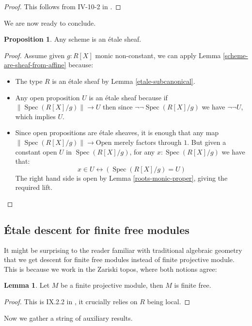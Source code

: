 \documentclass[10pt,a4paper]{article}
\theoremstyle{definition}
\newtheorem{lemma}[theorem]{Lemma}
\newtheorem{proposition}[theorem]{Proposition}
\DeclareMathOperator{\Spec}{Spec}
\newcommand{\propTrunc}[1]{\lVert #1 \rVert}
\begin{document}
\begin{proof}
  This follows from  IV-10-2 in \cite{lombardi-quitte}.
\end{proof}

We are now ready to conclude.

\begin{proposition}\label{scheme-is-etale-sheaf}
Any scheme is an \'etale sheaf.
\end{proposition}

\begin{proof}
Assume given $g:R[X]$ monic non-constant, we can apply Lemma \ref{scheme-are-sheaf-from-affine} because:
\begin{itemize}
\item The type $R$ is an \'etale sheaf by Lemma \ref{etale-subcanonical}.
\item Any open proposition $U$ is an \'etale sheaf because if $\propTrunc{\Spec(R[X]/g)}\to U$ then since $\neg\neg\Spec(R[X]/g)$ we have $\neg\neg U$, which implies $U$.
\item Since open propositions are \'etale sheaves, it is enough that any map $\propTrunc{\Spec(R[X]/g)}\to \mathrm{Open}$ merely factors through $1$. But given a constant open $U$ in $\Spec(R[X]/g)$, for any $x:\Spec(R[X]/g)$ we have that:
\[x\in U \leftrightarrow (\Spec(R[X]/g) = U)\]
The right hand side is open by Lemma \ref{roots-monic-proper}, giving the required lift. 
\end{itemize}
\end{proof}


\subsection{Étale descent for finite free modules}

It might be surprising to the reader familiar with traditional algebraic geometry that we get descent for finite free modules instead of finite projective module. This is because we work in the Zariski topos, where both notions agree:

\begin{lemma}\label{finite-projective-free}
Let $M$ be a finite projective module, then $M$ is finite free.
\end{lemma}

\begin{proof}
This is IX.2.2 in \cite{lombardi-quitte}, it crucially relies on $R$ being local.
\end{proof}

Now we gather a string of auxiliary results.
\end{document}
